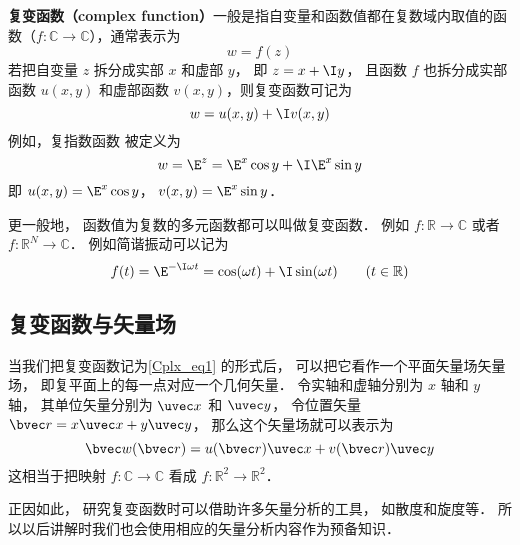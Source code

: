 
\textbf{复变函数（complex function）}一般是指自变量和函数值都在复数域内取值的函数（$f:\mathbb C \to \mathbb C$），通常表示为
\begin{equation}
w = f(z)
\end{equation}
若把自变量 $z$ 拆分成实部 $x$ 和虚部 $y$， 即 $z = x + \I y$， 且函数 $f$ 也拆分成实部函数 $u(x,y)$ 和虚部函数 $v(x,y)$，则复变函数可记为
\begin{equation}\label{Cplx_eq1}
w = u(x,y) + \I v(x,y)
\end{equation}
例如，复指数函数 被定义为
\begin{equation}\label{Cplx_eq3}
w = \E^z = \E^x \cos y + \I \E^x\sin y
\end{equation}
即 $u(x, y) = \E^x \cos y$， $v(x, y) = \E^x \sin y$．

更一般地， 函数值为复数的多元函数都可以叫做复变函数． 例如 $f: \mathbb R \to \mathbb C$ 或者 $f:\mathbb R^N \to \mathbb C$． 例如简谐振动可以记为
\begin{equation}
f(t) = \E^{-\I \omega t} = \cos(\omega t) + \I \sin(\omega t) \qquad (t \in \mathbb R)
\end{equation}

\subsection{复变函数与矢量场}
当我们把复变函数记为\autoref{Cplx_eq1} 的形式后， 可以把它看作一个平面矢量场矢量场， 即复平面上的每一点对应一个几何矢量． 令实轴和虚轴分别为 $x$ 轴和 $y$ 轴， 其单位矢量分别为 $\uvec x$ 和 $\uvec y$， 令位置矢量 $\bvec r = x \uvec x + y \uvec y$， 那么这个矢量场就可以表示为
\begin{equation}\label{Cplx_eq4}
\bvec w(\bvec r) = u(\bvec r) \uvec x + v(\bvec r) \uvec y
\end{equation}
这相当于把映射 $f:\mathbb C \to \mathbb C$ 看成 $f: \mathbb R^2 \to \mathbb R^2$．

正因如此， 研究复变函数时可以借助许多矢量分析的工具， 如散度和旋度等． 所以以后讲解时我们也会使用相应的矢量分析内容作为预备知识．

